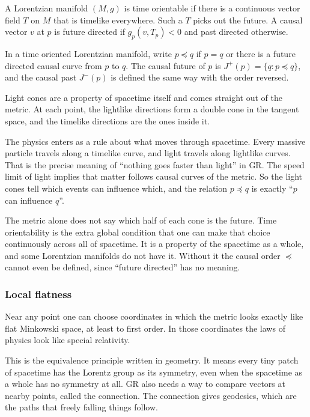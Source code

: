 \begin{definition}
A Lorentzian manifold $(M,g)$ is time orientable if there is a continuous vector field $T$ on $M$ that is timelike everywhere.
Such a $T$ picks out the future. A causal vector $v$ at $p$ is future directed if $g_p(v,T_p)<0$ and past directed otherwise.
\end{definition}

\begin{definition}
In a time oriented Lorentzian manifold, write $p\preceq q$ if $p=q$ or there is a future directed causal curve from $p$ to $q$.
The causal future of $p$ is $J^+(p)=\{q: p\preceq q\}$, and the causal past $J^-(p)$ is defined the same way with the order reversed.
\end{definition}

Light cones are a property of spacetime itself and comes straight out of the metric.
At each point, the lightlike directions form a double cone in the tangent space, and the timelike directions are the ones inside it.

The physics enters as a rule about what moves through spacetime.
Every massive particle travels along a timelike curve, and light travels along lightlike curves.
That is the precise meaning of ``nothing goes faster than light'' in GR.
The speed limit of light implies that matter follows causal curves of the metric.
So the light cones tell which events can influence which, and the relation $p\preceq q$ is exactly ``$p$ can influence $q$''.

The metric alone does not say which half of each cone is the future.
Time orientability is the extra global condition that one can make that choice continuously across all of spacetime.
It is a property of the spacetime as a whole, and some Lorentzian manifolds do not have it.
Without it the causal order $\preceq$ cannot even be defined, since ``future directed'' has no meaning.

\subsubsection{Local flatness}

Near any point one can choose coordinates in which the metric looks exactly like flat Minkowski space, at least to first order.
In those coordinates the laws of physics look like special relativity.

This is the equivalence principle written in geometry.
It means every tiny patch of spacetime has the Lorentz group as its symmetry, even when the spacetime as a whole has no symmetry at all.
GR also needs a way to compare vectors at nearby points, called the connection.
The connection gives geodesics, which are the paths that freely falling things follow.

